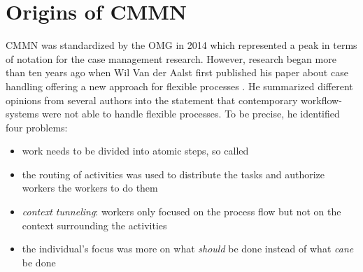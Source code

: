 \section{Origins of CMMN}
\ac{CMMN} was standardized by the \ac{OMG} in 2014 which represented a peak in terms of notation for the case management research. However, research began more than ten years ago when Wil Van der Aalst first published his paper about case handling offering a new approach for flexible processes \cite{aalst2003}. He summarized different opinions from several authors into the statement that contemporary workflow-systems were not able to handle flexible processes. To be precise, he identified four problems: 
\begin{itemize}
\item work needs to be divided into atomic steps, so called 
\item the routing of activities was used to distribute the tasks and authorize workers the workers to do them 
\item \textit{context tunneling}: workers only focused on the process flow but not on the context surrounding the activities
\item the individual's focus was more on what \textit{should} be done instead of what \textit{cane} be done 
\end{itemize} 

